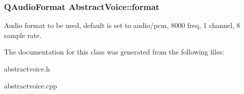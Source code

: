\hypertarget{class_abstract_voice_aa8718f0af1669ef7a84347c2d9a54cf9}{
\subsubsection[{format}]{\setlength{\rightskip}{0pt plus 5cm}\-Q\-Audio\-Format {\bf \-Abstract\-Voice\-::format}}}
\label{class_abstract_voice_aa8718f0af1669ef7a84347c2d9a54cf9}


\-Audio format to be used, default is set to audio/pcm, 8000 freq, 1 channel, 8 sample rate. 



\-The documentation for this class was generated from the following files\-:\begin{DoxyCompactItemize}
\item 
abstractvoice.\-h\item 
abstractvoice.\-cpp\end{DoxyCompactItemize}
